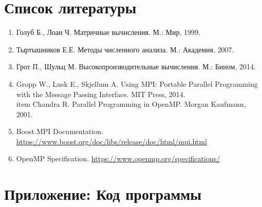 \documentclass[a4paper,12pt]{article}
\begin{document}
\section*{Список литературы}
\begin{enumerate}
    \item Голуб Б., Лоан Ч. Матричные вычисления. М.: Мир, 1999.
    \item Тыртышников Е.Е. Методы численного анализа. М.: Академия, 2007.
    \item Грот П., Шульц М. Высокопроизводительные вычисления. М.: Бином, 2014.
    \item Gropp W., Lusk E., Skjellum A. Using MPI: Portable Parallel Programming with the Message Passing Interface. MIT Press, 2014.
    \\item Chandra R. Parallel Programming in OpenMP. Morgan Kaufmann, 2001.
    \item Boost.MPI Documentation. \url{https://www.boost.org/doc/libs/release/doc/html/mpi.html}
    \item OpenMP Specification. \url{https://www.openmp.org/specifications/}
\end{enumerate}

\section*{Приложение: Код программы}
\end{document}
